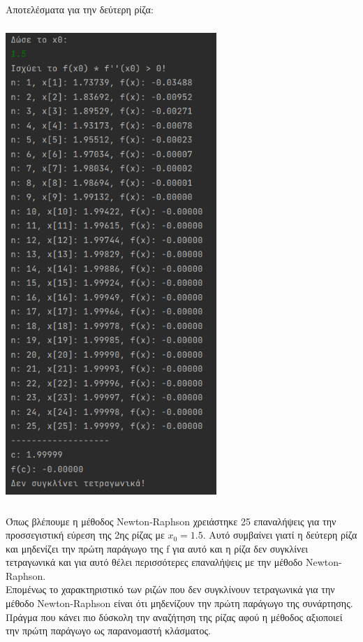 \documentclass{article}
\begin{document}
\vspace{3mm}
Αποτελέσματα για την δεύτερη ρίζα: \\
\begin{center}\includegraphics[width=8cm, height=18cm]{images/results_4.png} \end{center}
Όπως βλέπουμε η μέθοδος Newton-Raphson χρειάστηκε 25 επαναλήψεις για την προσσεγιστική εύρεση της 2ης ρίζας με \(x_0 = 1.5\). Αυτό συμβαίνει γιατί η δεύτερη ρίζα και μηδενίζει την πρώτη παράγωγο της f για αυτό και η ρίζα δεν συγκλίνει τετραγωνικά και για αυτό θέλει περισσότερες επαναλήψεις με την μέθοδο Newton-Raphson. \\

Επομένως το χαρακτηριστικό των ριζών που δεν συγκλίνουν τετραγωνικά για την μέθοδο Newton-Raphson είναι ότι μηδενίζουν την πρώτη παράγωγο της συνάρτησης. Πράγμα που κάνει πιο δύσκολη την αναζήτηση της ρίζας αφού η μέθοδος αξιοποιεί την πρώτη παράγωγο ως παρανομαστή κλάσματος.
\end{document}
